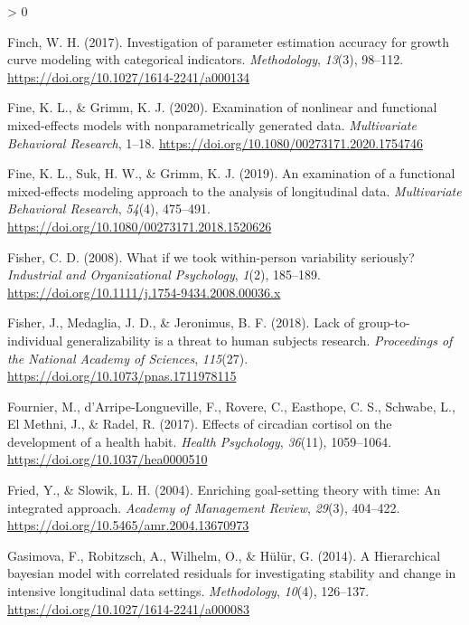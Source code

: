 \documentclass[
12pt, %
twoside,
english]{guelphthesis}
\newlength{\cslhangindent}
\newenvironment{CSLReferences}[2] %
 {%
  \setlength{\parindent}{0pt}
  \ifodd #1 \everypar{\setlength{\hangindent}{\cslhangindent}}\ignorespaces\fi
  \ifnum #2 > 0
  \setlength{\parskip}{\linespacing{2}}
  \fi
 }%
 {}
\theoremstyle{definition}
\theoremstyle{definition}
\theoremstyle{definition}
\theoremstyle{definition}
\theoremstyle{remark}
\begin{document}
\begin{CSLReferences}{1}{0}
\leavevmode{}%
Finch, W. H. (2017). Investigation of parameter estimation accuracy for growth curve modeling with categorical indicators. \emph{Methodology}, \emph{13}(3), 98--112. \url{https://doi.org/10.1027/1614-2241/a000134}

\leavevmode{}%
Fine, K. L., \& Grimm, K. J. (2020). Examination of nonlinear and functional mixed-effects models with nonparametrically generated data. \emph{Multivariate Behavioral Research}, 1--18. \url{https://doi.org/10.1080/00273171.2020.1754746}

\leavevmode{}%
Fine, K. L., Suk, H. W., \& Grimm, K. J. (2019). An examination of a functional mixed-effects modeling approach to the analysis of longitudinal data. \emph{Multivariate Behavioral Research}, \emph{54}(4), 475--491. \url{https://doi.org/10.1080/00273171.2018.1520626}

\leavevmode{}%
Fisher, C. D. (2008). What if we took within-person variability seriously? \emph{Industrial and Organizational Psychology}, \emph{1}(2), 185--189. \url{https://doi.org/10.1111/j.1754-9434.2008.00036.x}

\leavevmode{}%
Fisher, J., Medaglia, J. D., \& Jeronimus, B. F. (2018). Lack of group-to-individual generalizability is a threat to human subjects research. \emph{Proceedings of the National Academy of Sciences}, \emph{115}(27). \url{https://doi.org/10.1073/pnas.1711978115}

\leavevmode{}%
Fournier, M., d'Arripe-Longueville, F., Rovere, C., Easthope, C. S., Schwabe, L., El Methni, J., \& Radel, R. (2017). Effects of circadian cortisol on the development of a health habit. \emph{Health Psychology}, \emph{36}(11), 1059--1064. \url{https://doi.org/10.1037/hea0000510}

\leavevmode{}%
Fried, Y., \& Slowik, L. H. (2004). Enriching goal-setting theory with time: An integrated approach. \emph{Academy of Management Review}, \emph{29}(3), 404--422. \url{https://doi.org/10.5465/amr.2004.13670973}

\leavevmode{}%
Gasimova, F., Robitzsch, A., Wilhelm, O., \& Hülür, G. (2014). A Hierarchical bayesian model with correlated residuals for investigating stability and change in intensive longitudinal data settings. \emph{Methodology}, \emph{10}(4), 126--137. \url{https://doi.org/10.1027/1614-2241/a000083}


\end{CSLReferences}
\end{document}
